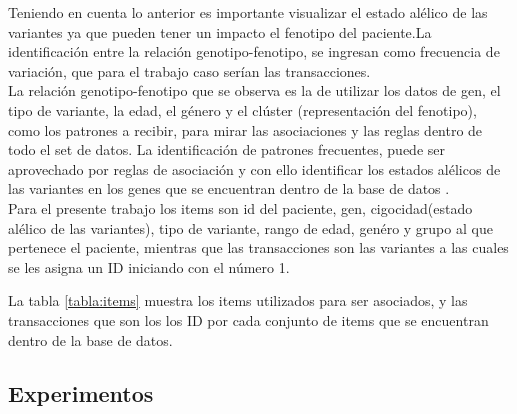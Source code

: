 Teniendo en cuenta lo anterior es importante visualizar el estado alélico de las variantes \cite{Hannah-Shmouni2015,Laboratories2015} ya que pueden tener un impacto el fenotipo del paciente.La identificación entre la relación genotipo-fenotipo, se ingresan como frecuencia de variación, que para el trabajo caso serían las transacciones\cite{Breuer2017}.\\

La relación genotipo-fenotipo que se observa es  la de utilizar los datos de gen, el tipo de variante, la edad, el género y el clúster (representación del fenotipo), como los patrones a recibir, para mirar las asociaciones y las reglas dentro de todo el set de datos. La identificación de patrones frecuentes, puede ser aprovechado por reglas de asociación y con ello identificar los estados alélicos de las variantes en los genes que se encuentran dentro de la base de datos \cite{breuler2017}.\\

Para el presente trabajo los items son id del paciente, gen, cigocidad(estado alélico de las variantes), tipo de variante, rango de edad, genéro y grupo al que pertenece el paciente, mientras que las transacciones son las variantes a las cuales se les asigna un ID iniciando con el número 1.

\begin{table}[H]
	\centering
\caption{ Tabla de items y transacciones}
\label{tabla:items}
\end{table}
 
La tabla \ref{tabla:items} muestra los items utilizados para ser asociados, y las transacciones que son los los ID por cada conjunto de items que se encuentran dentro de la base de datos.

\subsection{Experimentos}

